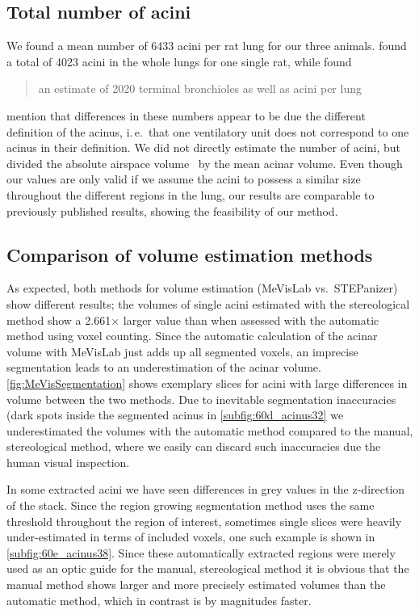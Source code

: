 \documentclass[draft,a4paper,DIVcalc,abstract,english]{scrartcl}
\newcommand{\ie}{i.\,e.\ }
\newcommand{\meantotalnumberofacini}{6433}
\newcommand{\difference}{2.661} %
\begin{document}
\subsection{Total number of acini}
We found a mean number of \meantotalnumberofacini\xspace acini per rat lung for our three animals.
\citet{Rodriguez1987} found a total of 4023 acini in the whole lungs for one single rat, while \citet{Mercer1987a} found \blockquote{an estimate of 2020 terminal bronchioles as well as acini per lung}.
\citeauthor{Mercer1987a} mention that differences in these numbers appear to be due the different definition of the acinus, \ie that one ventilatory unit does not correspond to one acinus in their definition.
We did not directly estimate the number of acini, but divided the absolute airspace volume~\citep{Tschanz2003} by the mean acinar volume.
Even though our values are only valid if we assume the acini to possess a similar size throughout the different regions in the lung, our results are comparable to previously published results, showing the feasibility of our method.

\subsection{Comparison of volume estimation methods}
As expected, both methods for volume estimation (MeVisLab vs.\ STEPanizer) show different results; the volumes of single acini estimated with the stereological method show a \difference\(\times\) larger value than when assessed with the automatic method using voxel counting.
Since the automatic calculation of the acinar volume with MeVisLab just adds up all segmented voxels, an imprecise segmentation leads to an underestimation of the acinar volume.
\autoref{fig:MeVisSegmentation} shows exemplary slices for acini with large differences in volume between the two methods.
Due to inevitable segmentation inaccuracies (dark spots inside the segmented acinus in \autoref{subfig:60d_acinus32} we underestimated the volumes with the automatic method compared to the manual, stereological method, where we easily can discard such inaccuracies due the human visual inspection.

In some extracted acini we have seen differences in grey values in the z-direction of the stack.
Since the region growing segmentation method uses the same threshold throughout the region of interest, sometimes single slices were heavily under-estimated in terms of included voxels, one such example is shown in \autoref{subfig:60e_acinus38}.
Since these automatically extracted regions were merely used as an optic guide for the manual, stereological method it is obvious that the manual method shows larger and more precisely estimated volumes than the automatic method, which in contrast is by magnitudes faster.
\end{document}
